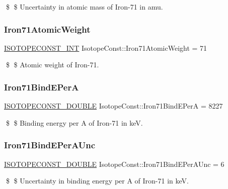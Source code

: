 \$ \$ Uncertainty in atomic mass of Iron-\/71 in amu. \mbox{\label{group___isotope_const-_iron-_fe71_ga04bfc085dbff0a393e325e36c5e6f60a}} 
\subsubsection{\texorpdfstring{Iron71\+Atomic\+Weight}{Iron71AtomicWeight}}
{\footnotesize\ttfamily \mbox{\hyperlink{group___isotope_const-_macros_ga5f18360b3e99483a35c32d789e62621c}{I\+S\+O\+T\+O\+P\+E\+C\+O\+N\+S\+T\+\_\+\+I\+NT}} Isotope\+Const\+::\+Iron71\+Atomic\+Weight = 71}

\$ \$ Atomic weight of Iron-\/71. \mbox{\label{group___isotope_const-_iron-_fe71_ga1e8de04f1b2c53a3c84db01019f70242}} 
\subsubsection{\texorpdfstring{Iron71\+Bind\+E\+PerA}{Iron71BindEPerA}}
{\footnotesize\ttfamily \mbox{\hyperlink{group___isotope_const-_macros_ga8f45a7272ce02c0b4c65c44636ed719a}{I\+S\+O\+T\+O\+P\+E\+C\+O\+N\+S\+T\+\_\+\+D\+O\+U\+B\+LE}} Isotope\+Const\+::\+Iron71\+Bind\+E\+PerA = 8227}

\$ \$ Binding energy per A of Iron-\/71 in keV. \mbox{\label{group___isotope_const-_iron-_fe71_gaa37c5497a142a274f3675b3d53797a78}} 
\subsubsection{\texorpdfstring{Iron71\+Bind\+E\+Per\+A\+Unc}{Iron71BindEPerAUnc}}
{\footnotesize\ttfamily \mbox{\hyperlink{group___isotope_const-_macros_ga8f45a7272ce02c0b4c65c44636ed719a}{I\+S\+O\+T\+O\+P\+E\+C\+O\+N\+S\+T\+\_\+\+D\+O\+U\+B\+LE}} Isotope\+Const\+::\+Iron71\+Bind\+E\+Per\+A\+Unc = 6}

\$ \$ Uncertainty in binding energy per A of Iron-\/71 in keV. \mbox{\label{group___isotope_const-_iron-_fe71_ga03bee0545bc6f9c6bef222376d8a5381}} 
